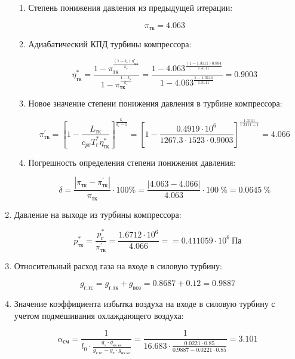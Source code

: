 \documentclass[a4paper,12pt]{article}
\begin{document}
\begin{enumerate}
	\begin{enumerate}
		
		\item Степень понижения давления из предыдущей итерации:
		
		\[
		\pi_{тк} = 4.063
		\]
		
		\item Адиабатический КПД турбины компрессора:
		
		\[
		\eta_{тк}^* = \frac{1 - \pi_{тк} ^ 
	                   {\frac{\left(1 - k_г \right) \eta_{ткп}^*}{k_г}}
					}{
					   1 - \pi_{тк} ^ {\frac{1 - k_г}{k_г}} 
					} = 
				\frac{1 - 4.063 ^ 
	                   {\frac{\left(1 - 1.3111 \right) 0.884 }{ 1.3111 }}
					}{
					   1 - 4.063 ^ {\frac{ 1 - 1.3111 }{ 1.3111 }} 
					} = 
			0.9003
		\]	
		
		\item Новое значение степени понижения давления в турбине компрессора:
		
		\[
		\pi_{тк}^\prime = \left[ 
							1 - \frac{L_{тк}}{c_{pг} T_г^* \eta_{тк}^*}	
						\right] ^ 
							\frac{k_г}{k_г - 1} =
					\left[ 
						1 - \frac{ 
								0.4919 \cdot 10^6  
							}{ 
								1267.3 \cdot 1523 \cdot 0.9003
							}	
					\right] ^ 
						\frac{ 1.3111 }{ 1.3111 - 1} =
					4.066
		\]
		
		\item Погрешность определения степени понижения давления:
		
		\[
		\delta = \frac{ \left| \pi_{тк} - \pi_{тк}^\prime \right| }{ \pi_{тк} } \cdot 100 \% =
				\frac{ 
					\left| 4.063 - 4.066 \right|
				}{ 
					4.063 
				} \cdot 100\ \% = 
				0.0645\ \% 
		\]
	
	\end{enumerate}
	
	\item Давление на выходе из турбины компрессора:
	
	\[
	p_{тк}^* = \frac{ p_г^* }{ \pi_{тк}^\prime } = \frac{ 1.6712 \cdot 10^6 }{ 4.066 } = 
		= 0.411059 \cdot 10^6\ Па
	\]
	
	\item Относительный расход газа на входе в силовую турбину:
	
	\[ g_{г.тс} = g_{г.тк} + g_{воз} = 0.8687 + 0.12 = 0.9887 \]

	\item Значение коэффициента избытка воздуха на входе в силовую турбину с учетом подмешивания охлаждающего воздуха:

	\[
		\alpha_{см} = \frac{1}{
				l_0 \cdot \frac{g_т \cdot g_{вх.кс}}{g_{г.тс} - g_т \cdot g_{вх.кс}}
		} =
		\frac{1}{
				16.683 \cdot \frac{
					0.0221 \cdot 0.85
					}{
					0.9887 -
					0.0221 \cdot 0.85
			}
		} =
		3.101
	\]


\end{enumerate}
\end{document}
